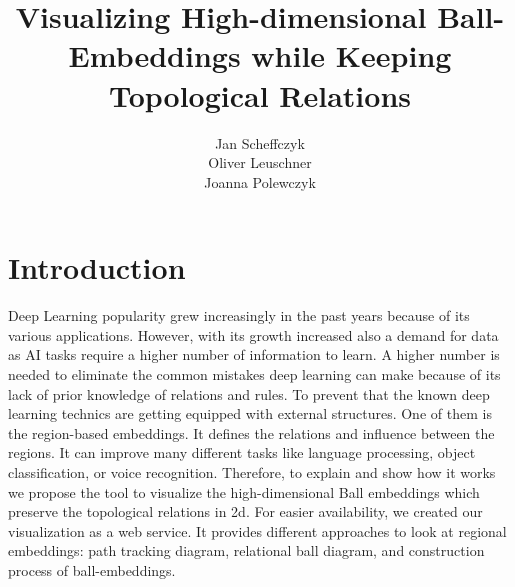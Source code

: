 \documentclass[]{article}
\title{Visualizing High-dimensional Ball-Embeddings
	while Keeping Topological Relations}
\author{Jan Scheffczyk \\ Oliver Leuschner \\ Joanna Polewczyk}
\begin{document}
\maketitle

%
%
%
\newpage
\section{Introduction}
Deep Learning popularity grew increasingly in the past years because of its various applications. However, with its growth increased also a demand for data as AI tasks require a higher number of information to learn. A higher number is needed to eliminate the common mistakes deep learning can make because of its lack of prior knowledge of relations and rules. To prevent that the known deep learning technics are getting equipped with external structures. One of them is the region-based embeddings. It defines the relations and influence between the regions. It can improve many different tasks like language processing, object classification, or voice recognition. Therefore, to explain and show how it works we propose the tool to visualize the high-dimensional Ball embeddings which preserve the topological relations in 2d. For easier availability, we created our visualization as a web service. It provides different approaches to look at regional embeddings: path tracking diagram, relational ball diagram, and construction process of ball-embeddings. 
\end{document}
